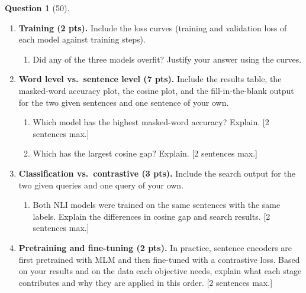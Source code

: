 \documentclass[12pt]{article}
\theoremstyle{definition}
\newtheorem{exercise}{Question}%
\begin{document}
\begin{exercise}[50]
\begin{enumerate}
  \item \textbf{Training (2 pts).} Include the loss curves (training and validation loss of each model against
  training steps).
  \begin{enumerate}
    \item Did any of the three models overfit? Justify your answer using the curves.
  \end{enumerate}

  \item \textbf{Word level vs.\ sentence level (7 pts).} Include the results table, the masked-word accuracy plot,
  the cosine plot, and the fill-in-the-blank output for the two given sentences and one sentence of your own.
  \begin{enumerate}
    \item Which model has the highest masked-word accuracy? Explain. [2 sentences max.]
    \item Which has the largest cosine gap? Explain. [2 sentences max.]
  \end{enumerate}

  \item \textbf{Classification vs.\ contrastive (3 pts).} Include the search output for the two given queries and
  one query of your own.
  \begin{enumerate}
    \item Both NLI models were trained on the same sentences with the same labels. Explain the differences in cosine gap and search results. [2 sentences max.]
  \end{enumerate}

  \item \textbf{Pretraining and fine-tuning (2 pts).} In practice, sentence encoders are first pretrained with MLM
  and then fine-tuned with a contrastive loss. Based on your results and on the data each objective needs, explain
  what each stage contributes and why they are applied in this order. [2 sentences max.]
\end{enumerate}

\end{exercise}
\end{document}
